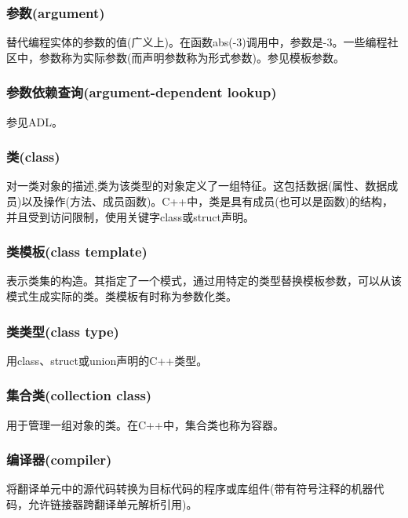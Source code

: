 \subsubsection{参数(argument)}

替代编程实体的参数的值(广义上)。在函数abs(-3)调用中，参数是-3。一些编程社区中，参数称为实际参数(而声明参数称为形式参数)。参见模板参数。

\subsubsection{参数依赖查询(argument-dependent lookup)}

参见ADL。

\subsubsection{类(class)}
 
对一类对象的描述,类为该类型的对象定义了一组特征。这包括数据(属性、数据成员)以及操作(方法、成员函数)。C++中，类是具有成员(也可以是函数)的结构，并且受到访问限制，使用关键字class或struct声明。

\subsubsection{类模板(class template)}

表示类集的构造。其指定了一个模式，通过用特定的类型替换模板参数，可以从该模式生成实际的类。类模板有时称为参数化类。

\subsubsection{类类型(class type)}

用class、struct或union声明的C++类型。

\subsubsection{集合类(collection class)}

用于管理一组对象的类。在C++中，集合类也称为容器。

\subsubsection{编译器(compiler)}

将翻译单元中的源代码转换为目标代码的程序或库组件(带有符号注释的机器代码，允许链接器跨翻译单元解析引用)。

